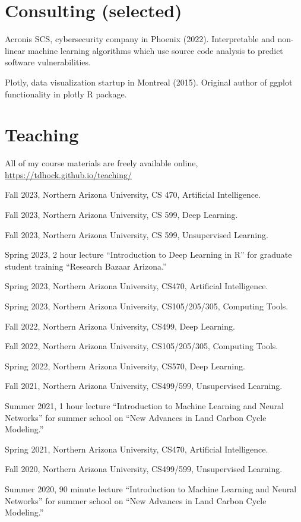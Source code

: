 \documentclass[margin,line]{res}
\begin{document}
\begin{resume}
\section{\sc Consulting (selected)}

Acronis SCS, cybersecurity company in Phoenix (2022). Interpretable
and non-linear machine learning algorithms which use source code
analysis to predict software vulnerabilities.

Plotly, data visualization startup in Montreal (2015). Original author
of ggplot functionality in plotly R package.

\section{\sc Teaching}

All of my course materials are freely available online,
\url{https://tdhock.github.io/teaching/}

Fall 2023, Northern Arizona University, CS 470, Artificial Intelligence.

Fall 2023, Northern Arizona University, CS 599, Deep Learning.

Fall 2023, Northern Arizona University, CS 599, Unsupervised Learning.

Spring 2023, 2 hour lecture ``Introduction to Deep Learning in R'' for
graduate student training ``Research Bazaar Arizona.''

Spring 2023, Northern Arizona University, CS470, Artificial Intelligence.

Spring 2023, Northern Arizona University, CS105/205/305, Computing Tools.

Fall 2022, Northern Arizona University, CS499, Deep Learning.

Fall 2022, Northern Arizona University, CS105/205/305, Computing Tools.

Spring 2022, Northern Arizona University, CS570, Deep Learning.

Fall 2021, Northern Arizona University, CS499/599, Unsupervised Learning.

Summer 2021, 1 hour lecture ``Introduction to Machine Learning and
Neural Networks'' for summer school on ``New Advances in Land Carbon
Cycle Modeling.''

Spring 2021, Northern Arizona University, CS470, Artificial Intelligence.

Fall 2020, Northern Arizona University, CS499/599, Unsupervised
Learning.

Summer 2020, 90 minute lecture ``Introduction to Machine Learning and
Neural Networks'' for summer school on ``New Advances in Land Carbon
Cycle Modeling.''


\end{resume}
\end{document}
